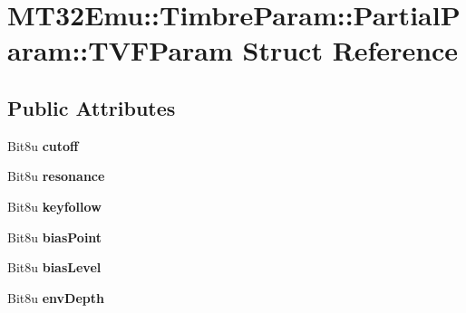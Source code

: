 \hypertarget{structMT32Emu_1_1TimbreParam_1_1PartialParam_1_1TVFParam}{\section{M\-T32\-Emu\-:\-:Timbre\-Param\-:\-:Partial\-Param\-:\-:T\-V\-F\-Param Struct Reference}
\label{structMT32Emu_1_1TimbreParam_1_1PartialParam_1_1TVFParam}
}
\subsection*{Public Attributes}
\begin{DoxyCompactItemize}
\item 
\hypertarget{structMT32Emu_1_1TimbreParam_1_1PartialParam_1_1TVFParam_ab9308d3e4453f2ff80f9acb7e61e74c3}{Bit8u {\bfseries cutoff}}\label{structMT32Emu_1_1TimbreParam_1_1PartialParam_1_1TVFParam_ab9308d3e4453f2ff80f9acb7e61e74c3}

\item 
\hypertarget{structMT32Emu_1_1TimbreParam_1_1PartialParam_1_1TVFParam_a535bd18c0570f0629dd1362f6339f4df}{Bit8u {\bfseries resonance}}\label{structMT32Emu_1_1TimbreParam_1_1PartialParam_1_1TVFParam_a535bd18c0570f0629dd1362f6339f4df}

\item 
\hypertarget{structMT32Emu_1_1TimbreParam_1_1PartialParam_1_1TVFParam_a228d2d86d5a306f796a939a23ad06dd4}{Bit8u {\bfseries keyfollow}}\label{structMT32Emu_1_1TimbreParam_1_1PartialParam_1_1TVFParam_a228d2d86d5a306f796a939a23ad06dd4}

\item 
\hypertarget{structMT32Emu_1_1TimbreParam_1_1PartialParam_1_1TVFParam_a3c5397f3560ef7968dd24912aaeb44e4}{Bit8u {\bfseries bias\-Point}}\label{structMT32Emu_1_1TimbreParam_1_1PartialParam_1_1TVFParam_a3c5397f3560ef7968dd24912aaeb44e4}

\item 
\hypertarget{structMT32Emu_1_1TimbreParam_1_1PartialParam_1_1TVFParam_a805daee97a438d8a16ab6b0561f4bd80}{Bit8u {\bfseries bias\-Level}}\label{structMT32Emu_1_1TimbreParam_1_1PartialParam_1_1TVFParam_a805daee97a438d8a16ab6b0561f4bd80}

\item 
\hypertarget{structMT32Emu_1_1TimbreParam_1_1PartialParam_1_1TVFParam_a603437d53bee7202ab8b1a217e60f9e2}{Bit8u {\bfseries env\-Depth}}\label{structMT32Emu_1_1TimbreParam_1_1PartialParam_1_1TVFParam_a603437d53bee7202ab8b1a217e60f9e2}


\end{DoxyCompactItemize}
